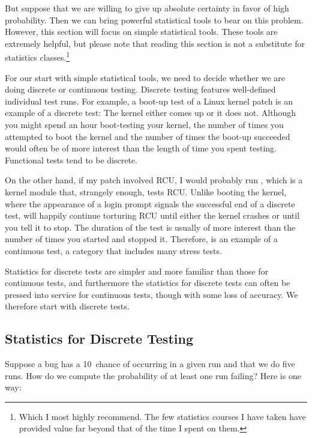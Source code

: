 But suppose that we are willing to give up absolute certainty in favor
of high probability.
Then we can bring powerful statistical tools to bear on this problem.
However, this section will focus on simple statistical tools.
These tools are extremely helpful, but please note that reading this
section is not a substitute for statistics classes.\footnote{
	Which I most highly recommend.
	The few statistics courses I have taken have provided value
	far beyond that of the time I spent on them.}

For our start with simple statistical tools, we need to decide whether
we are doing discrete or continuous testing.
Discrete testing features well-defined individual test runs.
For example, a boot-up test of a Linux kernel patch is an example
of a discrete test:
The kernel either comes up or it does not.
Although you might spend an hour boot-testing your kernel, the number of
times you attempted to boot the kernel and the number of times the
boot-up succeeded would often be of more interest than the length
of time you spent testing.
Functional tests tend to be discrete.

On the other hand, if my patch involved RCU, I would probably run
, which is a kernel module that, strangely enough, tests RCU\@.
Unlike booting the kernel, where the appearance of a login prompt
signals the successful end of a discrete test,  will happily
continue torturing RCU until either the kernel crashes or until you
tell it to stop.
The duration of the  test is usually of more
interest than the number of times you started and stopped it.
Therefore,  is an example of a continuous test, a category
that includes many stress tests.

Statistics for discrete tests are simpler and more familiar than those
for continuous tests, and furthermore the statistics for discrete tests
can often be pressed into service for continuous tests, though with some
loss of accuracy.
We therefore start with discrete tests.

\subsection{Statistics for Discrete Testing}
\label{sec:debugging:Statistics for Discrete Testing}

Suppose a bug has a 10\pct\ chance of occurring in a given run and that
we do five runs.
How do we compute the probability of at least one run failing?
Here is one way:

